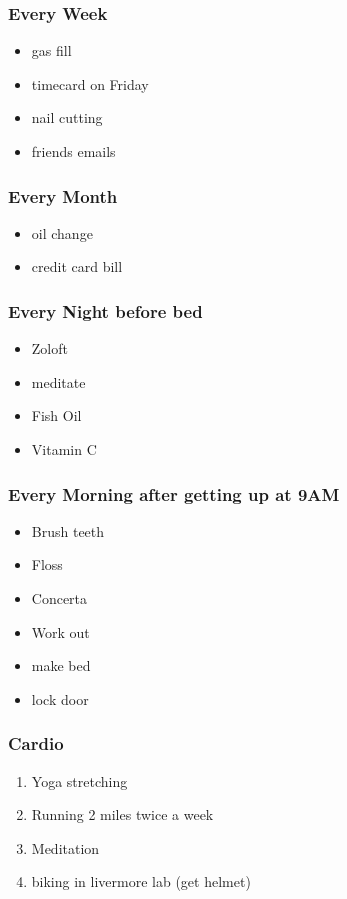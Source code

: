 \begin{frame}
\frametitle{Every Week}
\begin{itemize}
\item gas fill
\item timecard on Friday
\item nail cutting
\item friends emails
\end{itemize}
\end{frame}

\begin{frame}
\frametitle{Every Month}
\begin{itemize}
\item oil change
\item credit card bill
\end{itemize}
\end{frame}

\begin{frame}
\frametitle{Every Night before bed}
\begin{itemize}
\item Zoloft
\item meditate
\item Fish Oil
\item Vitamin C
\end{itemize}
\end{frame}

\begin{frame}
\frametitle{Every Morning after getting up at 9AM}
\begin{itemize}
\item Brush teeth
\item Floss
\item Concerta
\item Work out
\item make bed
\item lock door
\end{itemize}
\end{frame}

\begin{frame}
\frametitle{Cardio}
\begin{enumerate}
\item \tiny Yoga stretching
\item \tiny Running 2 miles twice a week
\item \tiny Meditation
\item \tiny biking in livermore lab (get helmet)
\end{enumerate}
\end{frame}

